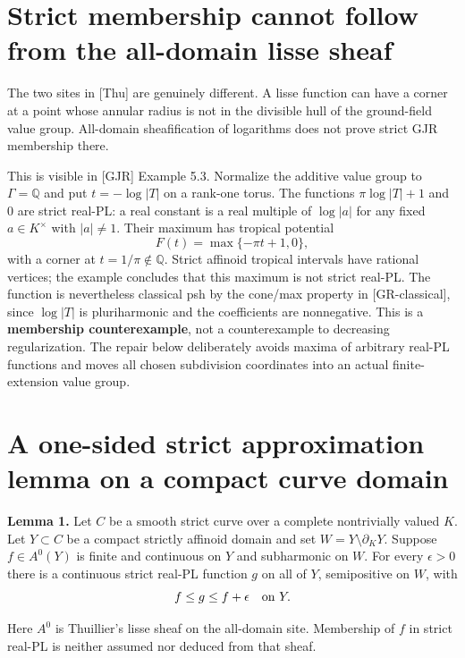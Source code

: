 \documentclass[
  11pt,
]{article}
\begin{document}
\section{Strict membership cannot follow from the all-domain lisse
sheaf}\label{strict-membership-cannot-follow-from-the-all-domain-lisse-sheaf}

The two sites in {[}Thu{]} are genuinely different. A lisse function can
have a corner at a point whose annular radius is not in the divisible
hull of the ground-field value group. All-domain sheafification of
logarithms does not prove strict GJR membership there.

This is visible in {[}GJR{]} Example 5.3. Normalize the additive value
group to \(\Gamma=\mathbb Q\) and put \(t=-\log|T|\) on a rank-one
torus. The functions \(\pi\log|T|+1\) and \(0\) are strict real-PL: a
real constant is a real multiple of \(\log|a|\) for any fixed
\(a\in K^\times\) with \(|a|\ne1\). Their maximum has tropical potential
\[F(t)=\max\{-\pi t+1,0\},\] with a corner at
\(t=1/\pi\notin\mathbb Q\). Strict affinoid tropical intervals have
rational vertices; the example concludes that this maximum is not strict
real-PL. The function is nevertheless classical psh by the cone/max
property in {[}GR-classical{]}, since \(\log|T|\) is pluriharmonic and
the coefficients are nonnegative. This is a \textbf{membership
counterexample}, not a counterexample to decreasing regularization. The
repair below deliberately avoids maxima of arbitrary real-PL functions
and moves all chosen subdivision coordinates into an actual
finite-extension value group.

\section{A one-sided strict approximation lemma on a compact curve
domain}\label{a-one-sided-strict-approximation-lemma-on-a-compact-curve-domain}

\textbf{Lemma 1.} Let \(C\) be a smooth strict curve over a complete
nontrivially valued \(K\). Let \(Y\subset C\) be a compact strictly
affinoid domain and set \(W=Y\setminus\partial_KY\). Suppose
\(f\in A^0(Y)\) is finite and continuous on \(Y\) and subharmonic on
\(W\). For every \(\epsilon>0\) there is a continuous strict real-PL
function \(g\) on all of \(Y\), semipositive on \(W\), with
\[f\le g\le f+\epsilon\quad\hbox{on }Y.\]

Here \(A^0\) is Thuillier's lisse sheaf on the all-domain site.
Membership of \(f\) in strict real-PL is neither assumed nor deduced
from that sheaf.
\end{document}
